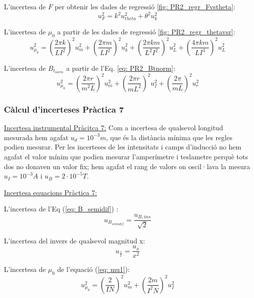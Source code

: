 \documentclass[11pt]{article}
\numberwithin{equation}{section}
\numberwithin{figure}{section}
\numberwithin{table}{section}
\begin{document}
L'incertesa de $F$ per obtenir les dades de regressió \ref{fig: PR2_regr_Fvstheta}:
\begin{equation}
    u_{F}^2 = k^2u_{theta}^2 + \theta^2u_{k}^2
\end{equation}

L'incertesa de $\mu_0$ a partir de les dades de regressió \ref{fig: PR2_regr_thetavsr}:
\begin{equation}
    u_{\mu_0}^2 = \left(\frac{2\pi k}{LI^2}\right)^2u_m^2 + \left(\frac{2\pi m}{LI^2}\right)^2u_k^2 + \left(\frac{2\pi km}{L^2I^2}\right)^2u_L^2 + \left(\frac{4\pi km}{LI^3}\right)^2u_L^2
\end{equation}

L'incertesa de $B_{t_{norm}}$ a partir de l'Eq. \eqref{eq: PR2_Btnorm}:
\begin{equation}
    u_{\mu_0}^2 = \left(\frac{2\pi r}{m^2L}\right)^2u_m^2 + \left(\frac{2\pi r}{mL^2}\right)^2u_I^2 + \left(\frac{2\pi}{mL}\right)^2u_r^2
\end{equation}

\subsubsection{Càlcul d'incerteses Pràctica 7}\label{sec: incerteses}


\underline{Incertesa instrumental Pràcitca 7:}
Com a incertesa de qualsevol longitud mesurada hem agafat $u_d = 10^{-3}m$, que és la distància mínima que les regles podien mesurar.
Per les incerteses de les intensitats i camps d'inducció no hem agafat el valor mínim que podien mesurar l'amperímetre i teslametre perquè tots dos no donaven un valor fix; hem agafat el rang de valors on oscil·lava la mesura $u_I = 10^{-3}A$ i $u_B = 2 \cdot 10^{-5}T$.

\underline{Incertesa equacions Pràctica 7:}

L'incertesa de l'Eq (\ref{eq: B_semidif}) :
\begin{equation}
    u_{B_{semidif}} = \frac{u_{B,ins}}{\sqrt{2}}
\end{equation}

L'incertesa del invers de qualsevol magnitud x:
\begin{equation}
    u_{\frac{1}{x}} = \frac{u_x}{x^2}
\end{equation}

L'incertesa de $\mu_0$ de l'equació (\ref{eq: mu1}):
\begin{equation}
    u_{\mu_0}^2 = \left(\frac{2}{IN}\right)^2u_m^2 + \left(\frac{2m}{I^2N}\right)^2u_I^2
\end{equation}
\end{document}
